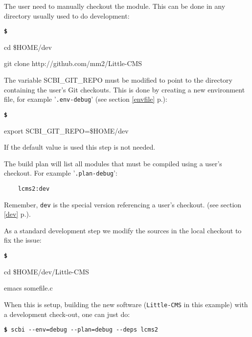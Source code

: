 \documentclass[a4paper,12pt,twoside]{article}
\newenvironment{shellcommand}{
	\begin{list}{ %
			\bfseries\texttt \$
		}{ %
			\ttfamily
			\setlength{\topsep}{-0.3ex}
			\setlength{\labelwidth}{1in}
			\setlength{\leftmargin}{0.7in}
			\setlength{\labelsep}{0.5ex}
			\setlength{\rightmargin}{0.5in}
			\setlength{\itemsep}{1ex}
			\setlength{\parsep}{0ex}
			\setlength{\listparindent}{0.5in}
		}
	}{
	\end{list}
}
\newcommand{\code}[1]{\texttt{#1}}
\newcommand{\seeref}[1]{see section \ref{#1} p.\pageref{#1}}
\newcommand{\file}[1]{'{\texttt{#1}}'}
\newcommand{\cmd}[1]{\tabto{1cm}\hspace{0.5cm}\texttt{\textbf{\$} #1}}
\newcommand{\ddash}{-{}-}
\begin{document}
\begin{description}[style=nextline]
	\item[Checkout the module] The user need to manually checkout the module. This can be done in any directory usually used to do development:

	\begin{shellcommand}
	\item cd \$HOME/dev
	\item git clone http://github.com/mm2/Little-CMS
	\end{shellcommand}

	\item[Setup SCBI enviroment] The variable SCBI\_GIT\_REPO must be modified to point to the directory containing the user's Git checkouts. This is done by creating a new environment file, for example \file{.env-debug} (\seeref{envfile}):

	\begin{shellcommand}
	\item export SCBI\_GIT\_REPO=\$HOME/dev
	\end{shellcommand}

	If the default value is used this step is not needed.

	\item[Create a build plan] The build plan will list all modules that must be compiled using a user's checkout. For example \file{.plan-debug}:

	\begin{lstlisting}
	lcms2:dev
	\end{lstlisting}

	Remember, \code{dev} is the special version referencing a user's checkout. (\seeref{dev}).

	\item[Modify the module's sources] As a standard development step we modify the sources in the local checkout to fix the issue:

	\begin{shellcommand}
	\item cd \$HOME/dev/Little-CMS
	\item emacs somefile.c
	\end{shellcommand}

\end{description}

When this is setup, building the new software (\code{Little-CMS} in this example) with a development check-out, one can just do:

\cmd{scbi \ddash{}env=debug \ddash{}plan=debug \ddash{}deps lcms2}
\end{document}
